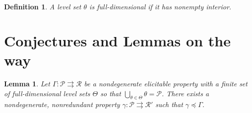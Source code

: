 \documentclass[12pt]{article}
\renewcommand{\P}{\mathcal{P}}
\newcommand{\R}{\mathcal{R}}
\newcommand{\toto}{\rightrightarrows}
\newtheorem{lemma}{Lemma}
\newtheorem{definition}{Definition}
\begin{document}
\begin{definition}
	A level set $\theta$ is \emph{full-dimensional} if it has nonempty interior.
\end{definition}



\section{Conjectures and Lemmas on the way}

\begin{lemma}\label{lem:gam-prime-exists}
	Let $\Gamma:\P \toto \R$ be a nondegenerate elicitable property with a finite set of full-dimensional level sets $\Theta$ so that $\bigcup_{\theta \in \Theta}\theta = \P$.
	There exists a nondegenerate, nonredundant property $\gamma: \P \toto \R'$ such that $\gamma \preceq \Gamma$. 
\end{lemma}
\end{document}

